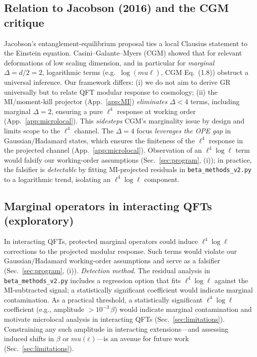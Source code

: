 \documentclass[aps,prd,onecolumn,superscriptaddress,nofootinbib]{revtex4-2}
\def\mu{mu}%
\begin{document}
\subsection{Relation to Jacobson (2016) and the CGM critique}
Jacobson’s entanglement-equilibrium proposal \cite{Jacobson2016} ties a local Clausius statement to the Einstein equation. Casini--Galante--Myers (CGM) \cite{CasiniGalanteMyers2016} showed that for relevant deformations of low scaling dimension, and in particular for \emph{marginal} \(\Delta=d/2=2\), logarithmic terms (e.g.\ \(\log(\mu\ell)\), CGM Eq.~(1.8)) obstruct a universal inference. Our framework differs: (i) we do not aim to derive GR universally but to relate QFT modular response to cosmology; (ii) the MI/moment-kill projector (App.~\ref{app:MI}) \emph{eliminates} \(\Delta<4\) terms, including marginal \(\Delta=2\), ensuring a pure \(\ell^4\) response at working order (App.~\ref{app:microlocal}). This \emph{sidesteps} CGM’s marginality issue by design and limits scope to the \(\ell^4\) channel. The \(\Delta=4\) focus \emph{leverages the OPE gap} in Gaussian/Hadamard states, which ensures the finiteness of the \(\ell^4\) response in the projected channel (App.~\ref{app:microlocal}). Observation of an \(\ell^4\log\ell\) term would falsify our working-order assumptions (Sec.~\ref{sec:program}, (i)); in practice, the falsifier is \emph{detectable} by fitting MI-projected residuals in \texttt{beta\_methods\_v2.py} to a logarithmic trend, isolating an \(\ell^4\log\ell\) component.

\subsection{Marginal operators in interacting QFTs (exploratory)}
In interacting QFTs, protected marginal operators could induce \(\ell^4\log\ell\) corrections to the projected modular response. Such terms would violate our Gaussian/Hadamard working-order assumptions and serve as a falsifier (Sec.~\ref{sec:program}, (i)). \emph{Detection method.} The residual analysis in \texttt{beta\_methods\_v2.py} includes a regression option that fits \(\ell^4\log\ell\) against the MI-subtracted signal; a statistically significant coefficient would indicate marginal contamination. As a practical threshold, a statistically significant \(\ell^4\log\ell\) coefficient (e.g., amplitude \(>10^{-3}\,\beta\)) would indicate marginal contamination and motivate microlocal analysis in interacting QFTs (Sec.~\ref{sec:limitations}). Constraining any such amplitude in interacting extensions—and assessing induced shifts in \(\beta\) or \(\mu(\varepsilon)\)—is an avenue for future work (Sec.~\ref{sec:limitations}).
\end{document}
